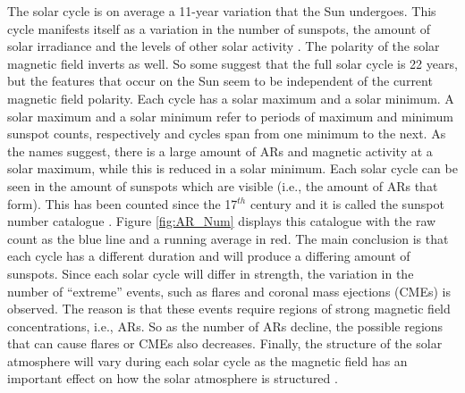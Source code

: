     The solar cycle is on average a 11-year variation that the Sun undergoes.
    This cycle manifests itself as a variation in the number of sunspots, the amount of solar irradiance and the levels of other solar activity \citep{climate}.
    The polarity of the solar magnetic field inverts as well.
    So some suggest that the full solar cycle is 22 years, but the features that occur on the Sun seem to be independent of the current magnetic field polarity. 
    Each cycle has a solar maximum and a solar minimum.
    A solar maximum and a solar minimum refer to periods of maximum and minimum sunspot counts, respectively and cycles span from one minimum to the next.
    As the names suggest, there is a large amount of ARs and magnetic activity at a solar maximum, while this is reduced in a solar minimum.
    Each solar cycle can be seen in the amount of sunspots which are visible (i.e., the amount of ARs that form).
    This has been counted since the 17$^{{th}}$ century and it is called the sunspot number catalogue \citep{Eddy18061976}.
    Figure \ref{fig:AR_Num} displays this catalogue with the raw count as the blue line and a running average in red.
    The main conclusion is that each cycle has a different duration and will produce a differing amount of sunspots.
    Since each solar cycle will differ in strength, the variation in the number of ``extreme'' events, such as flares and coronal mass ejections (CMEs) is observed.
    The reason is that these events require regions of strong magnetic field concentrations, i.e., ARs.
    So as the number of ARs decline, the possible regions that can cause flares or CMEs also decreases.
    Finally, the structure of the solar atmosphere will vary during each solar cycle as the magnetic field has an important effect on how the solar atmosphere is structured \citep{Sven}. 

